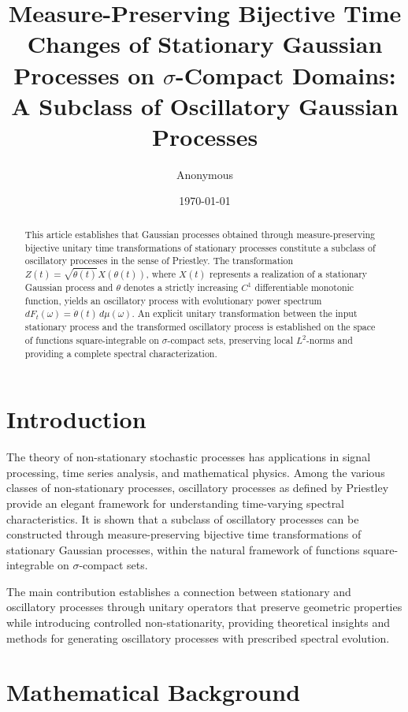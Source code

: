 \documentclass{article}
\title{Measure-Preserving Bijective Time Changes of Stationary Gaussian Processes on $\sigma$-Compact Domains: A Subclass of Oscillatory Gaussian Processes}
\author{Anonymous}
\date{\today}
\begin{document}
\maketitle

\begin{abstract}
This article establishes that Gaussian processes obtained through measure-preserving bijective unitary time transformations of stationary processes constitute a subclass of oscillatory processes in the sense of Priestley. The transformation $Z(t) = \sqrt{\dot{\theta}(t)} X(\theta(t))$, where $X(t)$ represents a realization of a stationary Gaussian process and $\theta$ denotes a strictly increasing $C^1$ differentiable monotonic function, yields an oscillatory process with evolutionary power spectrum $dF_t(\omega) = \dot{\theta}(t)\, d\mu(\omega)$. An explicit unitary transformation between the input stationary process and the transformed oscillatory process is established on the space of functions square-integrable on $\sigma$-compact sets, preserving local $L^2$-norms and providing a complete spectral characterization.
\end{abstract}

\tableofcontents

\section{Introduction}
The theory of non-stationary stochastic processes has applications in signal processing, time series analysis, and mathematical physics. Among the various classes of non-stationary processes, oscillatory processes as defined by Priestley provide an elegant framework for understanding time-varying spectral characteristics. It is shown that a subclass of oscillatory processes can be constructed through measure-preserving bijective time transformations of stationary Gaussian processes, within the natural framework of functions square-integrable on $\sigma$-compact sets.

The main contribution establishes a connection between stationary and oscillatory processes through unitary operators that preserve geometric properties while introducing controlled non-stationarity, providing theoretical insights and methods for generating oscillatory processes with prescribed spectral evolution.

\section{Mathematical Background}
\end{document}
